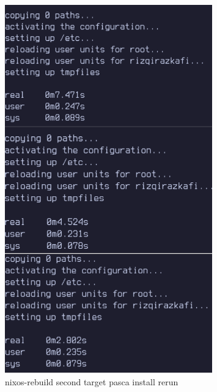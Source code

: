 \documentclass[10pt,]{report}
\begin{document}
\begin{adjustwidth}{20pt}{}
\begin{adjustwidth}{20pt}{}
		\begin{figure}[H]
			\begin{center}
				\includegraphics[width=0.8\textwidth]{images/nix-target/nix-rerun-26-com.png}
			\end{center}
			\caption{nixos-rebuild second target pasca install rerun}
		\end{figure}


\end{adjustwidth}
\end{adjustwidth}
\end{document}
